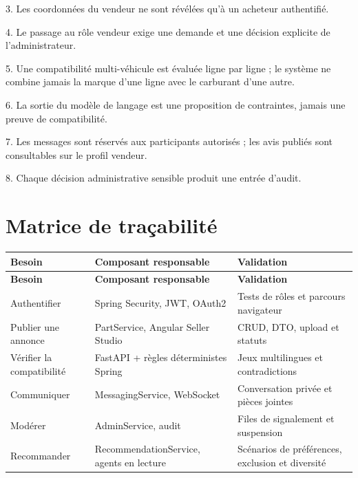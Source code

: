 3. Les coordonnées du vendeur ne sont révélées qu'à un acheteur authentifié.


4. Le passage au rôle vendeur exige une demande et une décision explicite de l'administrateur.


5. Une compatibilité multi-véhicule est évaluée ligne par ligne ; le système ne combine jamais la marque d'une ligne avec le carburant d'une autre.


6. La sortie du modèle de langage est une proposition de contraintes, jamais une preuve de compatibilité.


7. Les messages sont réservés aux participants autorisés ; les avis publiés sont consultables sur le profil vendeur.


8. Chaque décision administrative sensible produit une entrée d'audit.


\section{Matrice de traçabilité}

{\small\singlespacing{}
\begin{longtable}{|>{\raggedright\arraybackslash}p{}|>{\raggedright\arraybackslash}p{}|>{\raggedright\arraybackslash}p{}|}
\hline
\rowcolor{tablehead} \color{white}\bfseries Besoin & \color{white}\bfseries Composant responsable & \color{white}\bfseries Validation \\ \hline
\endfirsthead
\rowcolor{tablehead} \color{white}\bfseries Besoin & \color{white}\bfseries Composant responsable & \color{white}\bfseries Validation \\ \hline
\endhead
\hline\endfoot
Authentifier & Spring Security, JWT, OAuth2 & Tests de rôles et parcours navigateur \\ \hline
\rowcolor{tablerow} Publier une annonce & PartService, Angular Seller Studio & CRUD, DTO, upload et statuts \\ \hline
Vérifier la compatibilité & FastAPI + règles déterministes Spring & Jeux multilingues et contradictions \\ \hline
\rowcolor{tablerow} Communiquer & MessagingService, WebSocket & Conversation privée et pièces jointes \\ \hline
Modérer & AdminService, audit & Files de signalement et suspension \\ \hline
\rowcolor{tablerow} Recommander & RecommendationService, agents en lecture & Scénarios de préférences, exclusion et diversité \\ \hline
\end{longtable}
}


